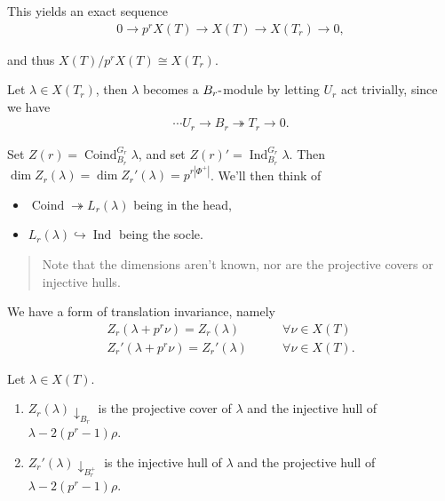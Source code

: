 This yields an exact sequence
\begin{align*}  
0 \to p^r X(T) \to X(T) \to X(T_r) \to 0
,\end{align*}

and thus \(X(T) / p^r X(T) \cong X(T_r)\).

Let \(\lambda \in X(T_r)\), then \(\lambda\) becomes a
\(B_r{\hbox{-}}\)module by letting \(U_r\) act trivially, since we have
\begin{align*}  
\cdots U_r \to B_r \twoheadrightarrow T_r \to 0
.\end{align*}

Set \(Z(r) = \operatorname{Coind}_{B_r}^{G_r} \lambda\), and set
\(Z(r)' = \operatorname{Ind}_{B_r}^{G_r} \lambda\). Then
\(\dim Z_r(\lambda) = \dim Z_r'(\lambda) = p^{r{\left\lvert {\Phi^+} \right\rvert}}\).
We'll then think of

\begin{itemize}
\tightlist
\item
  \(\operatorname{Coind}\twoheadrightarrow L_r(\lambda)\) being in the
  head,
\item
  \(L_r(\lambda) \hookrightarrow\operatorname{Ind}\) being the socle.
\end{itemize}

\begin{quote}
Note that the dimensions aren't known, nor are the projective covers or
injective hulls.
\end{quote}

We have a form of translation invariance, namely
\begin{align*}  
Z_r(\lambda + p^r\nu) = Z_r(\lambda) \qquad &\forall \nu \in X(T) \\
Z_r'(\lambda + p^r\nu) = Z_r'(\lambda) \qquad &\forall \nu \in X(T)
.\end{align*}

\begin{proposition}[?]

Let \(\lambda \in X(T)\).

\begin{enumerate}
\def\labelenumi{\arabic{enumi}.}
\tightlist
\item
  \(Z_r(\lambda){\downarrow}_{B_r}\) is the projective cover of
  \(\lambda\) and the injective hull of \(\lambda - 2(p^r-1)\rho\).
\item
  \(Z_r'(\lambda){\downarrow}_{B_r^+}\) is the injective hull of
  \(\lambda\) and the projective hull of \(\lambda - 2(p^r-1)\rho\).
\end{enumerate}

\end{proposition}

